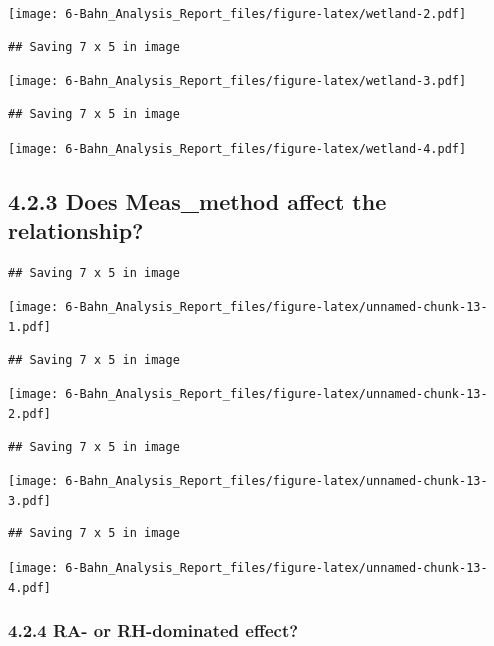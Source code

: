 \documentclass[]{article}
\begin{document}
\texttt{[image: 6-Bahn\_Analysis\_Report\_files/figure-latex/wetland-2.pdf]}

\begin{verbatim}
## Saving 7 x 5 in image
\end{verbatim}

\texttt{[image: 6-Bahn\_Analysis\_Report\_files/figure-latex/wetland-3.pdf]}

\begin{verbatim}
## Saving 7 x 5 in image
\end{verbatim}

\texttt{[image: 6-Bahn\_Analysis\_Report\_files/figure-latex/wetland-4.pdf]}

\hypertarget{does-meas_method-affect-the-relationship}{%
\subsection{4.2.3 Does Meas\_method affect the
relationship?}\label{does-meas_method-affect-the-relationship}}

\begin{verbatim}
## Saving 7 x 5 in image
\end{verbatim}

\texttt{[image: 6-Bahn\_Analysis\_Report\_files/figure-latex/unnamed-chunk-13-1.pdf]}

\begin{verbatim}
## Saving 7 x 5 in image
\end{verbatim}

\texttt{[image: 6-Bahn\_Analysis\_Report\_files/figure-latex/unnamed-chunk-13-2.pdf]}

\begin{verbatim}
## Saving 7 x 5 in image
\end{verbatim}

\texttt{[image: 6-Bahn\_Analysis\_Report\_files/figure-latex/unnamed-chunk-13-3.pdf]}

\begin{verbatim}
## Saving 7 x 5 in image
\end{verbatim}

\texttt{[image: 6-Bahn\_Analysis\_Report\_files/figure-latex/unnamed-chunk-13-4.pdf]}

\hypertarget{ra--or-rh-dominated-effect}{%
\subsubsection{4.2.4 RA- or RH-dominated
effect?}\label{ra--or-rh-dominated-effect}}
\end{document}
